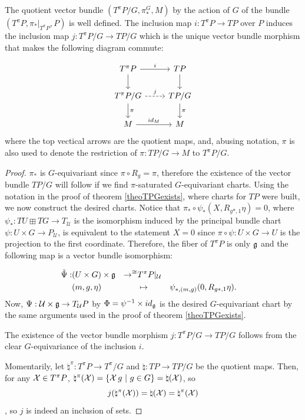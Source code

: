 \begin{theorem}\label{theoTpiPGSubbundle}
The quotient vector bundle $(T^\pi P/G, \pi^G_*, M)$ by the action of $G$ of the bundle $(T^\pi P, \pi_*|_{T^\pi P}, P)$ is well defined. The inclusion map $i: T^\pi P \to TP$ over $P$ induces the inclusion map $j: T^\pi P/G \to TP/G$ which is the unique vector bundle morphism that makes the following diagram commute:

\begin{equation}
    \begin{tikzcd}
        T^\pi P \ar{r}{i} \ar{d} & TP \ar{d} \\
        T^\pi P/G \ar[dashed]{r}{j} \arrow{d}{\pi} & TP/G \arrow{d}{\pi} \\
        M \arrow{r}{id_M} & M
    \end{tikzcd}
\end{equation}
where the top vectical arrows are the quotient maps, and, abusing notation, $\pi$ is also used to denote the restriction of $\pi: TP/G \to M$ to $T^\pi P/G$.
\end{theorem}

\begin{proof}
$\pi_*$ is $G$-equivariant since $\pi \circ R_g = \pi$, therefore the existence of the vector bundle $TP/G$ will follow if we find $\pi$-saturated $G$-equivariant charts. Using the notation in the proof of theorem \ref{theoTPGexists}, where charts for $TP$ were built, we now construct the desired charts. Notice that $\pi_* \circ \psi_* (X, R_{g*, 1} \eta) = 0$, where $\psi_* : TU \boxplus TG \to T_{\mathcal U}$ is the isomorphism induced by the principal bundle chart $\psi: U \times G \to P_{\mathcal U}$, is equivalent to the statement $X = 0$ since $\pi \circ \psi: U \times G \to U$ is the projection to the first coordinate. Therefore, the fiber of $T^\pi P$ is only $\mathfrak{g}$ and the following map is a vector bundle isomorphism:

\begin{align*}
    \Tilde \Psi :& (U \times G) \times \mathfrak{g} & \to^{\cong} & T^\pi P|_{\mathcal U} \\    
                 & (m, g, \eta)&& \mapsto &&\psi_{*, (m, g)}(0, R_{g*, 1} \eta).
\end{align*}
Now, $\Psi : \mathcal U \times \mathfrak{g}  \to  T_{\mathcal U}P$ by $\Phi = \psi^{-1} \times id_{\mathfrak{g}}$ is the desired $G$-equivariant chart by the same arguments used in the proof of theorem \ref{theoTPGexists}.

The existence of the vector bundle morphism $j: T^\pi P/G \to TP/G$ follows from the clear $G$-equivariance of the inclusion $i$.

Momentarily, let $\natural^\pi: T^\pi P \to T^\pi/G$ and $\natural: TP \to TP/G$ be the quotient maps. Then, for any $\mathcal{X} \in T^\pi P$, $\natural^\pi(\mathcal{X}) = \left\{ \mathcal{X} \, g \ |\  g \in G \right\} = \natural(\mathcal{X})$, so \[j(\natural^\pi(\mathcal{X})) = \natural(\mathcal{X}) = \natural^\pi(\mathcal{X})\], so $j$ is indeed an inclusion of sets.
\end{proof}

